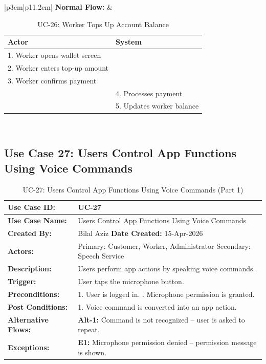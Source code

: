 \newpage

{\small
\renewcommand{\arraystretch}{1.05}
\begin{table}[H]
\centering
\begin{tabular}{|p{3cm}|p{11.2cm}|}
\hline
\textbf{Normal Flow:} &
\begin{tabular}[t]{|p{5.4cm}|p{5.4cm}|}
\hline
\textbf{Actor} & \textbf{System} \\ \hline
1. Worker opens wallet screen & \\ \hline
2. Worker enters top-up amount & \\ \hline
3. Worker confirms payment & \\ \hline
 & 4. Processes payment \\ \hline
 & 5. Updates worker balance \\ \hline
\end{tabular} \\ \hline
\end{tabular}
\caption{UC-26: Worker Tops Up Account Balance}
\end{table}
}

\newpage

\subsection*{Use Case 27: Users Control App Functions Using Voice Commands}

{\small
\renewcommand{\arraystretch}{1.05}
\begin{table}[H]
\centering
\begin{tabular}{|p{3cm}|p{11.2cm}|}
\hline
\textbf{Use Case ID:} & UC-27 \\ \hline
\textbf{Use Case Name:} & Users Control App Functions Using Voice Commands \\ \hline
\textbf{Created By:} & Bilal Aziz \hfill \textbf{Date Created:} 15-Apr-2026 \\ \hline
\textbf{Actors:} & Primary: Customer, Worker, Administrator \quad Secondary: Speech Service \\ \hline
\textbf{Description:} & Users perform app actions by speaking voice commands. \\ \hline
\textbf{Trigger:} & User taps the microphone button. \\ \hline
\textbf{Preconditions:} & 1. User is logged in. \newline 2. Microphone permission is granted. \\ \hline
\textbf{Post Conditions:} & 1. Voice command is converted into an app action. \\ \hline
\textbf{Alternative Flows:} & \textbf{Alt-1:} Command is not recognized -- user is asked to repeat. \\ \hline
\textbf{Exceptions:} & \textbf{E1:} Microphone permission denied -- permission message is shown. \\ \hline
\end{tabular}
\caption*{UC-27: Users Control App Functions Using Voice Commands (Part 1)}
\end{table}
}

